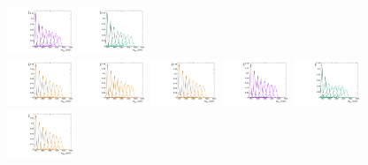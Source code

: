 \begin{figure}[htbp]
  \includegraphics[width=0.18\textwidth]{fig/analysisAppendix/templateSignalVsMX_fromDC_WprToWZ_MVV_mu_LP_bb_LDy.pdf}
  \includegraphics[width=0.18\textwidth]{fig/analysisAppendix/templateSignalVsMX_fromDC_WprToWH_MVV_mu_LP_bb_LDy.pdf}\\
  \includegraphics[width=0.18\textwidth]{fig/analysisAppendix/templateSignalVsMX_fromDC_GbuToWW_MVV_mu_HP_nobb_LDy.pdf}
  \includegraphics[width=0.18\textwidth]{fig/analysisAppendix/templateSignalVsMX_fromDC_RadToWW_MVV_mu_HP_nobb_LDy.pdf}
  \includegraphics[width=0.18\textwidth]{fig/analysisAppendix/templateSignalVsMX_fromDC_ZprToWW_MVV_mu_HP_nobb_LDy.pdf}
  \includegraphics[width=0.18\textwidth]{fig/analysisAppendix/templateSignalVsMX_fromDC_WprToWZ_MVV_mu_HP_nobb_LDy.pdf}
  \includegraphics[width=0.18\textwidth]{fig/analysisAppendix/templateSignalVsMX_fromDC_WprToWH_MVV_mu_HP_nobb_LDy.pdf}\\
  \includegraphics[width=0.18\textwidth]{fig/analysisAppendix/templateSignalVsMX_fromDC_GbuToWW_MVV_mu_LP_nobb_LDy.pdf}

\end{figure}
